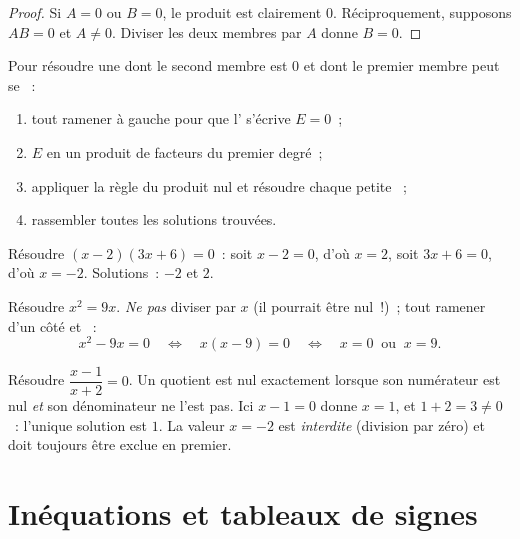 \begin{proof}
Si $A = 0$ ou $B = 0$, le produit est clairement $0$. Réciproquement,
supposons $AB = 0$ et $A \neq 0$. Diviser les deux membres par $A$ donne
$B = 0$.
\end{proof}

\begin{method}\label{met:g10:algebra:zeroproduct}
Pour résoudre une  dont le second membre est $0$ et dont le
premier membre peut se ~:
\begin{enumerate}
  \item tout ramener à gauche pour que l' s'écrive $E = 0$~;
  \item {} $E$ en un produit de facteurs du premier degré~;
  \item appliquer la règle du produit nul et résoudre chaque petite
        ~;
  \item rassembler toutes les solutions trouvées.
\end{enumerate}
\end{method}

\begin{example}\label{ex:g10:algebra:zeroproduct}
Résoudre $(x - 2)(3x + 6) = 0$~: soit $x - 2 = 0$, d'où $x = 2$, soit
$3x + 6 = 0$, d'où $x = -2$. Solutions~: $-2$ et $2$.

Résoudre $x^2 = 9x$. \emph{Ne pas} diviser par $x$ (il pourrait être
nul~!)~; tout ramener d'un côté et ~:
\[
x^2 - 9x = 0
\quad\Longleftrightarrow\quad
x(x - 9) = 0
\quad\Longleftrightarrow\quad
x = 0 \ \text{ ou } \ x = 9 .
\]
\end{example}

\begin{example}\label{ex:g10:algebra:quotient}
Résoudre $\dfrac{x - 1}{x + 2} = 0$. Un quotient est nul exactement lorsque
son numérateur est nul \emph{et} son dénominateur ne l'est pas. Ici
$x - 1 = 0$ donne $x = 1$, et $1 + 2 = 3 \neq 0$~: l'unique solution est
$1$. La valeur $x = -2$ est \emph{interdite} (division par zéro) et doit
toujours être exclue en premier.
\end{example}

\section{Inéquations et tableaux de signes}


